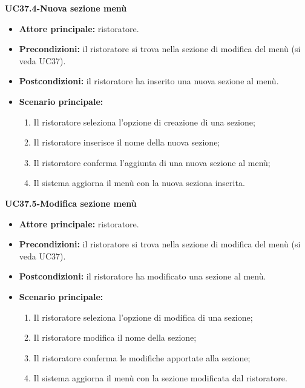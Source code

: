 \textbf{UC37.4-Nuova sezione menù}  
\begin{itemize}
    \item \textbf{Attore principale:} ristoratore.
    \item \textbf{Precondizioni:} il ristoratore si trova nella sezione di modifica del menù (si veda UC37).
    \item \textbf{Postcondizioni:} il ristoratore ha inserito una nuova sezione al menù.
    \item \textbf{Scenario principale:}
    \begin{enumerate}
        \item Il ristoratore seleziona l'opzione di creazione di una sezione;
        \item Il ristoratore inserisce il nome della nuova sezione;
        \item Il ristoratore conferma l'aggiunta di una nuova sezione al menù;
        \item Il sistema aggiorna il menù con la nuova seziona inserita.
    \end{enumerate}
\end{itemize}

\textbf{UC37.5-Modifica sezione menù}  
\begin{itemize}
    \item \textbf{Attore principale:} ristoratore.
    \item \textbf{Precondizioni:} il ristoratore si trova nella sezione di modifica del menù (si veda UC37).
    \item \textbf{Postcondizioni:} il ristoratore ha modificato una sezione al menù.
    \item \textbf{Scenario principale:}
    \begin{enumerate}
        \item Il ristoratore seleziona l'opzione di modifica di una sezione;
        \item Il ristoratore modifica il nome della sezione;
        \item Il ristoratore conferma le modifiche apportate alla sezione;
        \item Il sistema aggiorna il menù con la sezione modificata dal ristoratore.
    \end{enumerate}
\end{itemize}


